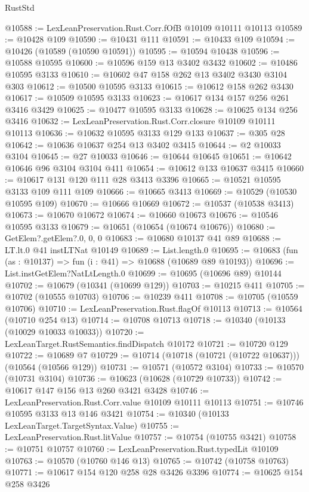\begin{lexlean}{RustStd}
\begin{coremodule}
@10588 := LexLeanPreservation.Rust.Corr.fOfB @10109 @10111 @10113
@10589 := @10428 @109
@10590 := @10431 @111
@10591 := @10433 @109
@10594 := @10426 (@10589 (@10590 @10591))
@10595 := @10594 @10438
@10596 := @10588 @10595
@10600 := @10596 @159 @13 @3402 @3432
@10602 := @10486 @10595 @3133
@10610 := @10602 @47 @158 @262 @13 @3402 @3430 @3104 @303
@10612 := @10500 @10595 @3133
@10615 := @10612 @158 @262 @3430
@10617 := @10509 @10595 @3133
@10623 := @10617 @134 @157 @256 @261 @3416 @3429
@10625 := @10477 @10595 @3133
@10628 := @10625 @134 @256 @3416
@10632 := LexLeanPreservation.Rust.Corr.closure @10109 @10111 @10113
@10636 := @10632 @10595 @3133 @129 @133
@10637 := @305 @28
@10642 := @10636 @10637 @254 @13 @3402 @3415
@10644 := @2 @10033 @3104
@10645 := @27 @10033
@10646 := @10644 @10645
@10651 := @10642 @10646 @96 @3104 @3104 @411
@10654 := @10612 @133 @10637 @3415
@10660 := @10617 @131 @120 @111 @28 @3413 @3396
@10665 := @10521 @10595 @3133 @109 @111 @109
@10666 := @10665 @3413
@10669 := @10529 (@10530 @10595 @109)
@10670 := @10666 @10669
@10672 := @10537 (@10538 @3413)
@10673 := @10670 @10672
@10674 := @10660 @10673
@10676 := @10546 @10595 @3133
@10679 := @10651 (@10654 (@10674 @10676))
@10680 := GetElem?.getElem?.{0, 0, 0}
@10683 := @10680 @10137 @41 @89
@10688 := LT.lt.{0} @41 instLTNat @10149
@10689 := List.length.{0}
@10695 := @10683 (fun (as : @10137) => fun (i : @41) => @10688 (@10689 @89 @10193))
@10696 := List.instGetElem?NatLtLength.{0}
@10699 := @10695 (@10696 @89) @10144
@10702 := @10679 (@10341 (@10699 @129))
@10703 := @10215 @411
@10705 := @10702 (@10555 @10703)
@10706 := @10239 @411
@10708 := @10705 (@10559 @10706)
@10710 := LexLeanPreservation.Rust.flagOf @10113
@10713 := @10564 (@10710 @254 @13)
@10714 := @10708 @10713
@10718 := @10340 (@10133 (@10029 @10033 @10033))
@10720 := LexLeanTarget.RustSemantics.findDispatch @10172
@10721 := @10720 @129
@10722 := @10689 @7
@10729 := @10714 (@10718 (@10721 (@10722 @10637))) (@10564 (@10566 @129))
@10731 := @10571 (@10572 @3104)
@10733 := @10570 (@10731 @3104)
@10736 := @10623 (@10628 (@10729 @10733))
@10742 := @10617 @147 @156 @13 @260 @3421 @3428
@10746 := LexLeanPreservation.Rust.Corr.value @10109 @10111 @10113
@10751 := @10746 @10595 @3133 @13 @146 @3421
@10754 := @10340 (@10133 LexLeanTarget.TargetSyntax.Value)
@10755 := LexLeanPreservation.Rust.litValue
@10757 := @10754 (@10755 @3421)
@10758 := @10751 @10757
@10760 := LexLeanPreservation.Rust.typedLit @10109
@10763 := @10570 (@10760 @146 @13)
@10765 := @10742 (@10758 @10763)
@10771 := @10617 @154 @120 @258 @28 @3426 @3396
@10774 := @10625 @154 @258 @3426

\end{coremodule}
\end{lexlean}

